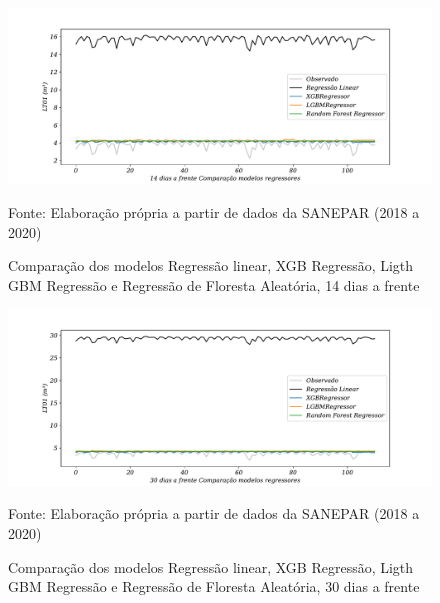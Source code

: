 \begin{figure}[H]
	\centering
	\caption{Comparação dos modelos Regressão linear, XGB Regressão, Ligth GBM Regressão e Regressão de Floresta Aleatória, 14 dias a frente }
	\label{fig:30-LR-XGB-LGBM-RF24}
	\includegraphics[width=1\linewidth]{Apendices/Figuras/modelagem-24h/14-LR-XGB-LGBM-RF}
	
Fonte: Elaboração própria a partir de dados da SANEPAR (2018 a 2020)
\end{figure}

\begin{figure}[H]
	\centering
	\caption{Comparação dos modelos Regressão linear, XGB Regressão, Ligth GBM Regressão e Regressão de Floresta Aleatória, 30 dias a frente }
	\label{fig:60-LR-XGB-LGBM-RF24}
	\includegraphics[width=1\linewidth]{Apendices/Figuras/modelagem-24h/30-LR-XGB-LGBM-RF}
	
Fonte: Elaboração própria a partir de dados da SANEPAR (2018 a 2020)
\end{figure}